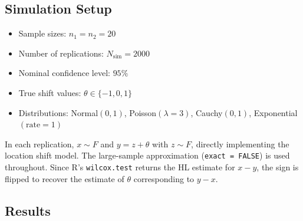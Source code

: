 \documentclass[10pt]{article}
\begin{document}
\subsection{Simulation Setup}

\begin{itemize}
    \item Sample sizes: $n_1 = n_2 = 20$
    \item Number of replications: $N_{\text{sim}} = 2000$
    \item Nominal confidence level: $95\%$
    \item True shift values: $\theta \in \{-1, 0, 1\}$
    \item Distributions: Normal$(0,1)$, Poisson$(\lambda=3)$, Cauchy$(0,1)$, Exponential$(\text{rate}=1)$
\end{itemize}

In each replication, $x \sim F$ and $y = z + \theta$ with $z \sim F$, directly implementing the location shift model. The large-sample approximation (\texttt{exact = FALSE}) is used throughout. Since R's \texttt{wilcox.test} returns the HL estimate for $x - y$, the sign is flipped to recover the estimate of $\theta$ corresponding to $y - x$.

\subsection{Results}
\end{document}

